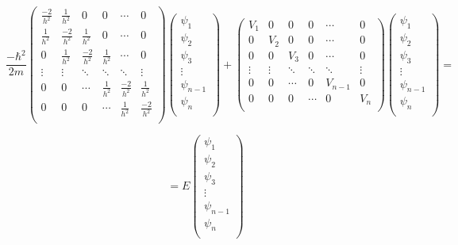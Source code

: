 \documentclass[12pt]{article}
\begin{document}
\begin{equation*}
\frac{-\hbar^2}{2m} \left(
\begin{matrix}
\frac{-2}{h^2} & \frac{1}{h^2} & 0 & 0 &  \cdots & 0 \\
\frac{1}{h^2} &  \frac{-2}{h^2} & \frac{1}{h^2} & 0 & \cdots & 0\\
0 & \frac{1}{h^2} &  \frac{-2}{h^2} & \frac{1}{h^2} & \cdots & 0\\
\vdots & \vdots&\ddots &\ddots &\ddots& \vdots \\
0 & 0   &\cdots &\frac{1}{h^2}&  \frac{-2}{h^2} & \frac{1}{h^2} \\
0 & 0 & 0  &\cdots & \frac{1}{h^2} &  \frac{-2}{h^2} \\
\end{matrix}
\right)
\left(
\begin{matrix}
\psi_1 \\
\psi_2 \\
\psi_3 \\
\vdots\\
\psi_{n-1} \\
\psi_{n} \\
\end{matrix}
\right)
+
\left(
\begin{matrix}
V_1 & 0 & 0 & 0 &  \cdots & 0 \\
0 & V_2 & 0 & 0 & \cdots & 0\\
0 & 0 & V_3 & 0 & \cdots & 0\\
\vdots & \vdots&\ddots &\ddots &\ddots& \vdots \\
0 & 0   &\cdots &0& V_{n-1} & 0 \\
0 & 0 & 0  &\cdots & 0 & V_{n} \\
\end{matrix}
\right)
\left(
\begin{matrix}
\psi_1 \\
\psi_2 \\
\psi_3 \\
\vdots\\
\psi_{n-1} \\
\psi_{n} \\
\end{matrix}
\right)	
=
\end{equation*}

\begin{equation}
=
E
\left(
\begin{matrix}
\psi_1 \\
\psi_2 \\
\psi_3 \\
\vdots\\
\psi_{n-1} \\
\psi_{n} \\
\end{matrix}
\right)
\end{equation} \\
\end{document}
